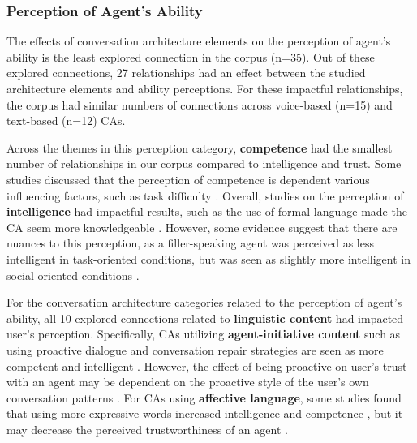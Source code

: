 \documentclass[sigconf,screen,review, anonymous]{acmart}
\newcommand{\cmt}[1]{}%
\begin{document}
\subsubsection{Perception of Agent's Ability}

The effects of conversation architecture elements on the perception of agent's ability is the least explored connection in the corpus (n=35). Out of these explored connections, 27 relationships had an effect between the studied architecture elements and ability perceptions. For these impactful relationships, the corpus had similar numbers of connections across voice-based (n=15) and text-based (n=12) CAs.

Across the themes in this perception category, \textbf{competence} had the smallest number of relationships in our corpus compared to intelligence and trust. Some studies discussed that the perception of competence is dependent various influencing factors, such as task difficulty \cite{kraus2020effects}\cmt{[64]}. Overall, studies on the perception of \textbf{intelligence} had impactful results, such as the use of formal language made the CA seem more knowledgeable \cite{volkel2022user}\cmt{[75]}. However, some evidence suggest that there are nuances to this perception, as a filler-speaking agent was perceived as less intelligent in task-oriented conditions, but was seen as slightly more intelligent in social-oriented conditions \cite{jeong2019exploring}\cmt{[10]}.

For the conversation architecture categories related to the perception of agent's ability, all 10 explored connections related to \textbf{linguistic content} had impacted user's perception. Specifically, CAs utilizing \textbf{agent-initiative content} such as using proactive dialogue and conversation repair strategies are seen as more competent \cite{kraus2020effects}\cmt{[64]} and intelligent \cite{ashktorab2019resilient}\cmt{[88]}. However, the effect of being proactive on user's trust with an agent may be dependent on the proactive style of the user's own conversation patterns \cite{kraus2020effects}\cmt{[64]}. For CAs using \textbf{affective language}, some studies found that using more expressive words increased intelligence and competence \cite{lee2019s}\cmt{[55]}\cite{yang2017perceived}\cmt{[44]}, but it may decrease the perceived trustworthiness of an agent 
\cite{healey2013relating}\cmt{[39]}.
\end{document}
